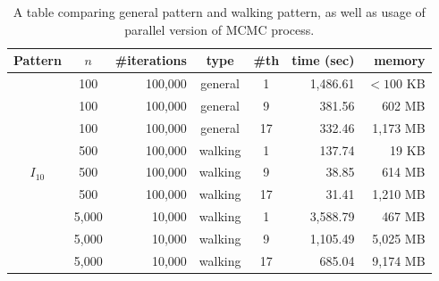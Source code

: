 \begin{table}[]
\centering
\begin{tabular}{|c|c|r|c|c|r|r|}
\hline
\textbf{Pattern} & \textbf{$n$} & \textbf{\#iterations} & \textbf{type} & \textbf{\#th} & \textbf{time (sec)} & \textbf{memory} \\ \hline
\multirow{9}{*}{$I_{10}$}
 & 100 & 100,000 & general & 1 & 1,486.61 & $<100$ KB \\ \cline{2-7} 
 & 100 & 100,000 & general & 9 & 381.56 & 602 MB \\ \cline{2-7} 
 & 100 & 100,000 & general & 17 & 332.46 & 1,173 MB \\ \cline{2-7} 
 & 500 & 100,000 & walking & 1 & 137.74 & 19 KB \\ \cline{2-7} 
 & 500 & 100,000 & walking & 9 & 38.85 & 614 MB \\ \cline{2-7} 
 & 500 & 100,000 & walking & 17 & 31.41 & 1,210 MB \\ \cline{2-7} 
 & 5,000 & 10,000 & walking & 1 & 3,588.79 & 467 MB \\ \cline{2-7} 
 & 5,000 & 10,000 & walking & 9 & 1,105.49 & 5,025 MB \\ \cline{2-7} 
 & 5,000 & 10,000 & walking & 17 & 685.04 & 9,174 MB \\ \hline
\end{tabular}
\caption{A table comparing general pattern and walking pattern, as well as usage of parallel version of MCMC process.}
\label{measurements3}
\end{table}